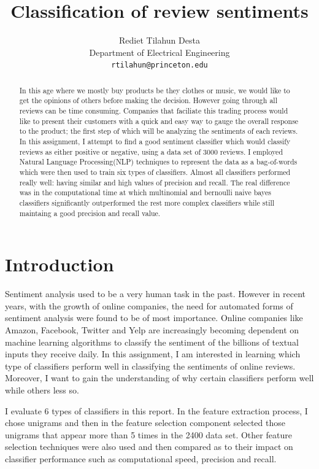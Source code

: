 \documentclass{article} %
\title{Classification of review sentiments}
\author{
Rediet Tilahun Desta\\
Department of Electrical Engineering\\
\texttt{rtilahun@princeton.edu} \\
}
\begin{document}
\maketitle

\begin{abstract}
In this age where we mostly buy products be they clothes or music, we would like to get the opinions of others before making the decision. However going through all reviews can be time consuming. Companies that faciliate this trading process would like to present their customers with a quick and easy way to gauge the overall response to the product; the first step of which will be analyzing the sentiments of each reviews. In this assignment, I attempt to find a good sentiment classifier which would classify reviews as either positive or negative, using a data set of 3000 reviews. I employed Natural Language Processing(NLP) techniques to represent the data as a bag-of-words which were then used to train six types of classifiers.  Almost all classifiers performed really well: having similar and high values of precision and recall. The real difference was in the computational time at which multinomial and bernoulli naive bayes classifiers significantly outperformed the rest more complex classifiers while still maintaing a good precision and recall value. 
\end{abstract}

\section{Introduction}
Sentiment analysis used to be a very human task in the past. However in recent years, with the growth of online companies, the need for automated forms of sentiment analysis were found to be of most importance. Online companies like Amazon, Facebook, Twitter and Yelp are increasingly becoming dependent on machine learning algorithms to classify the sentiment of the billions of textual inputs they receive daily. In this assignment, I am interested in learning which type of classifiers perform well in classifying the sentiments of online reviews. Moreover, I want to gain the understanding of why certain classifiers perform well while others less so. 

I evaluate 6 types of classifiers in this report. In the feature extraction process, I chose unigrams and then in the feature selection component selected those unigrams that appear more than 5 times in the 2400 data set. Other feature selection techniques were also used and then compared as to their impact on classifier performance such as computational speed, precision and recall. 
\end{document}
